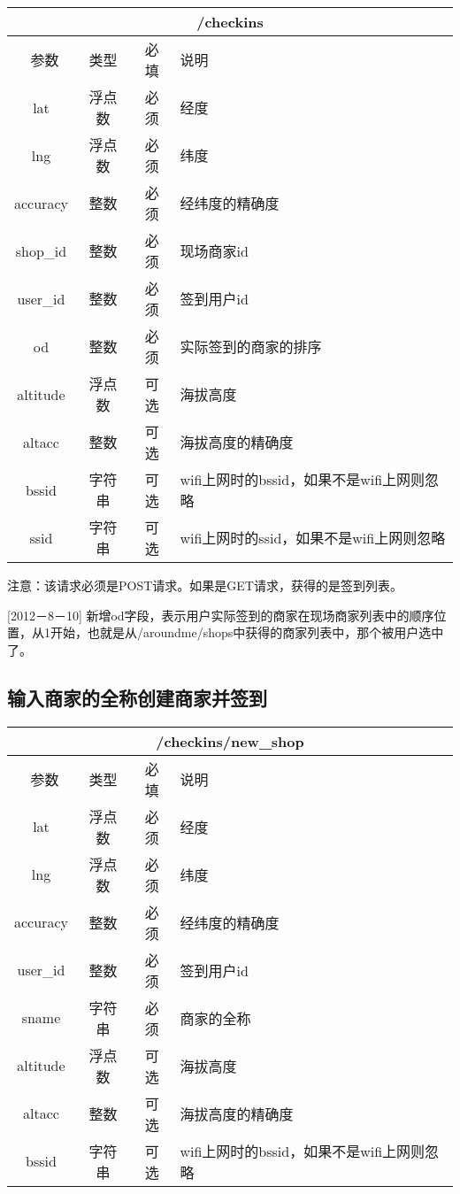 \documentclass[cs4size]{ctexartutf8}
\begin{document}
\begin{table}[H]
   \begin{center}
\begin{tabular}{|c|c|c|p{12cm}|}
\hline
\multicolumn{4}{|c|}{/checkins} \\
\hline\hline
 \  参数  & 类型 & 必填 &  说明  \\
\hline
 lat  & 浮点数 & 必须 & 经度\\
\hline
 lng  &  浮点数 & 必须 & 纬度\\ 
\hline
 accuracy  & 整数 & 必须 & 经纬度的精确度\\ 
\hline
 shop\_id  & 整数 & 必须 &  现场商家id\\ 
\hline
 user\_id  & 整数 & 必须 &  签到用户id\\ 
\hline
 od  & 整数 & 必须 &  实际签到的商家的排序\\  
\hline
 altitude  &  浮点数 & 可选 & 海拔高度\\ 
\hline
 altacc  & 整数 & 可选 & 海拔高度的精确度\\  
\hline
 bssid  & 字符串 & 可选 & wifi上网时的bssid，如果不是wifi上网则忽略\\  
\hline
 ssid  & 字符串 & 可选 & wifi上网时的ssid，如果不是wifi上网则忽略\\  
\hline
\end{tabular}
   \end{center}
\end{table}

注意：该请求必须是POST请求。如果是GET请求，获得的是签到列表。

[2012－8－10] 新增od字段，表示用户实际签到的商家在现场商家列表中的顺序位置，从1开始，也就是从/aroundme/shops中获得的商家列表中，那个被用户选中了。



\subsection{输入商家的全称创建商家并签到}

\begin{table}[H]
   \begin{center}
\begin{tabular}{|c|c|c|p{12cm}|}
\hline
\multicolumn{4}{|c|}{/checkins/new\_shop} \\
\hline\hline
 \  参数  & 类型 & 必填 &  说明  \\
\hline
 lat  & 浮点数 & 必须 & 经度\\
\hline
 lng  &  浮点数 & 必须 & 纬度\\ 
\hline
 accuracy  & 整数 & 必须 & 经纬度的精确度\\ 
\hline
 user\_id  & 整数 & 必须 &  签到用户id\\ 
\hline
 sname  & 字符串 & 必须 &  商家的全称\\  
\hline
 altitude  &  浮点数 & 可选 & 海拔高度\\ 
\hline
 altacc  & 整数 & 可选 & 海拔高度的精确度\\  
\hline
 bssid  & 字符串 & 可选 & wifi上网时的bssid，如果不是wifi上网则忽略\\  
\hline
\end{tabular}
   \end{center}
\end{table}
\end{document}
